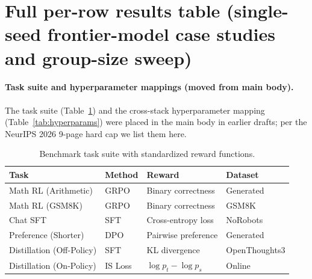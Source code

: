 \section{Full per-row results table (single-seed frontier-model case studies and group-size sweep)}
\label{sec:appendix:full-results}

\paragraph{Task suite and hyperparameter mappings (moved from main body).}
The task suite (Table~\ref{tab:tasks}) and the cross-stack hyperparameter
mapping (Table~\ref{tab:hyperparams}) were placed in the main body in
earlier drafts; per the NeurIPS 2026 9-page hard cap we list them here.

\begin{table}[ht]
\centering
\caption{Benchmark task suite with standardized reward functions.}
\label{tab:tasks}
\begin{tabular}{llll}
\toprule
\textbf{Task} & \textbf{Method} & \textbf{Reward} & \textbf{Dataset} \\
\midrule
Math RL (Arithmetic) & GRPO & Binary correctness & Generated \\
Math RL (GSM8K) & GRPO & Binary correctness & GSM8K \\
Chat SFT & SFT & Cross-entropy loss & NoRobots \\
Preference (Shorter) & DPO & Pairwise preference & Generated \\
Distillation (Off-Policy) & SFT & KL divergence & OpenThoughts3 \\
Distillation (On-Policy) & IS Loss & $\log p_t - \log p_s$ & Online \\
\bottomrule
\end{tabular}
\end{table}


